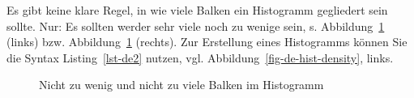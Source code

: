 \documentclass[
  letterpaper,
  twoside,
  open=any]{scrbook}
\theoremstyle{definition}
\theoremstyle{definition}
\theoremstyle{definition}
\theoremstyle{remark}
\begin{document}
Es gibt keine klare Regel, in wie viele Balken ein Histogramm gegliedert
sein sollte. Nur: Es sollten werder sehr viele noch zu wenige sein, s.
Abbildung~\ref{fig-zu-wenig-viele} (links) bzw.
Abbildung~\ref{fig-zu-wenig-viele} (rechts). Zur Erstellung eines
Histogramms können Sie die Syntax Listing~\ref{lst-de2} nutzen, vgl.
Abbildung~\ref{fig-de-hist-density}, links.

\begin{figure}

\begin{minipage}{0.50\linewidth}



\end{minipage}%
%
\begin{minipage}{0.50\linewidth}



\end{minipage}%

\caption{\label{fig-zu-wenig-viele}Nicht zu wenig und nicht zu viele
Balken im Histogramm}

\end{figure}%
\end{document}
